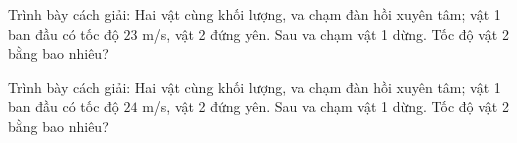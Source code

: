 \begin{bt}
Trình bày cách giải: Hai vật cùng khối lượng, va chạm đàn hồi xuyên tâm; vật 1 ban đầu có tốc độ $23$ m/s, vật 2 đứng yên. Sau va chạm vật 1 dừng. Tốc độ vật 2 bằng bao nhiêu?
\end{bt}

\begin{bt}
Trình bày cách giải: Hai vật cùng khối lượng, va chạm đàn hồi xuyên tâm; vật 1 ban đầu có tốc độ $24$ m/s, vật 2 đứng yên. Sau va chạm vật 1 dừng. Tốc độ vật 2 bằng bao nhiêu?
\end{bt}
